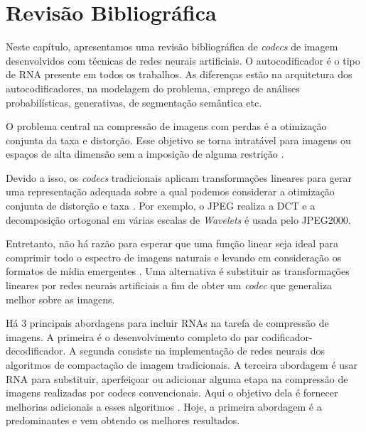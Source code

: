 \chapter{Revisão Bibliográfica}

Neste capítulo, apresentamos uma revisão bibliográfica de \textit{codecs} de imagem desenvolvidos com técnicas de redes neurais artificiais. O autocodificador é o tipo de RNA presente em todos os trabalhos. As diferenças estão na arquitetura dos autocodificadores, na modelagem do problema, emprego de análises probabilísticas, generativas, de segmentação semântica etc.  

O problema central na compressão de imagens com perdas é a otimização conjunta da taxa e distorção. Esse objetivo se torna intratável para imagens ou espaços de alta dimensão sem a imposição de alguma restrição \cite{gersho2012vector}. 


Devido a isso, os \textit{codecs} tradicionais aplicam transformações lineares para gerar uma representação adequada sobre a qual podemos considerar a otimização conjunta de distorção e taxa \cite{End2016Balle}.  Por exemplo, o JPEG realiza a DCT e a decomposição ortogonal em várias escalas de \textit{Wavelets} é usada pelo JPEG2000.

Entretanto, não há razão para esperar que uma função linear seja ideal para comprimir todo o espectro de imagens naturais e levando em consideração os formatos de mídia emergentes \cite{santurkar2018generative}.  Uma alternativa é substituir as transformações lineares por redes neurais artificiais a fim de obter um \textit{codec} que generaliza melhor sobre as imagens. 


Há 3 principais abordagens para incluir RNAs na tarefa de compressão de imagens. A primeira é o desenvolvimento completo do par codificador-decodificador. A segunda consiste na implementação de redes neurais dos algoritmos de compactação de imagem tradicionais. A terceira abordagem é usar RNA para substituir, aperfeiçoar ou adicionar alguma etapa na compressão de imagens realizadas por codecs convencionais. Aqui o objetivo dela é fornecer melhorias adicionais a esses algoritmos \cite{Jiang1999}. Hoje, a primeira abordagem é a predominantes e vem obtendo os melhores resultados.  


